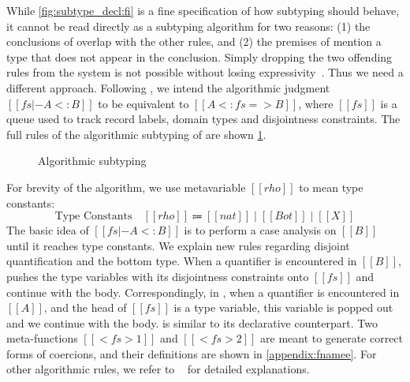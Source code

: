 While \cref{fig:subtype_decl:fi} is a fine specification of how subtyping
should behave, it cannot be read directly as a subtyping algorithm for two
reasons: (1) the conclusions of  overlap with the other
rules, and (2) the premises of  mention a type that does not
appear in the conclusion. Simply dropping the two offending rules
from the system is not possible without losing
expressivity~\cite{Laurent12note}. Thus we need a
different approach. Following \namee, we intend the algorithmic judgment $[[ fs |- A <: B ]]$ to be
equivalent to $[[ A <: fs => B ]]$, where $[[fs]]$ is a queue used to track record labels, domain types and disjointness constraints.
The full rules of the algorithmic subtyping of \fnamee are shown \cref{fig:algo:sub:fi}.



\renewcommand{\rulehl}[2][gray!40]{%
  \colorbox{#1}{$\displaystyle#2$}}

\begin{figure}[t]
  \centering
  \caption{Algorithmic subtyping}
  \label{fig:algo:sub:fi}
\end{figure}

\renewcommand{\rulehl}[1]{#1}



For brevity of the algorithm, we use metavariable $[[rho]]$ to mean type constants:
\[
  \text{Type Constants}\quad [[rho]] \Coloneqq  [[nat]] \mid [[Bot]] \mid [[X]]
\]
The basic idea of $[[ fs |- A <: B ]]$ is to perform a case analysis on $[[B]]$
until it reaches type constants. We explain new rules regarding disjoint
quantification and the bottom type.
When a quantifier is encountered in $[[B]]$,  pushes
the type variables with its disjointness constraints onto $[[fs]]$ and continue
with the body. Correspondingly, in , when a quantifier is
encountered in $[[A]]$, and the head of $[[fs]]$ is a type variable, this
variable is popped out and we continue with the body.
 is similar to its declarative counterpart.
Two meta-functions $[[ < fs >1 ]]$
and $[[ < fs >2 ]]$ are meant to generate correct forms of coercions, and their
definitions are shown in \cref{appendix:fnamee}. For other algorithmic rules, we refer to
\namee~\cite{bi_et_al:LIPIcs:2018:9227} for detailed explanations.


